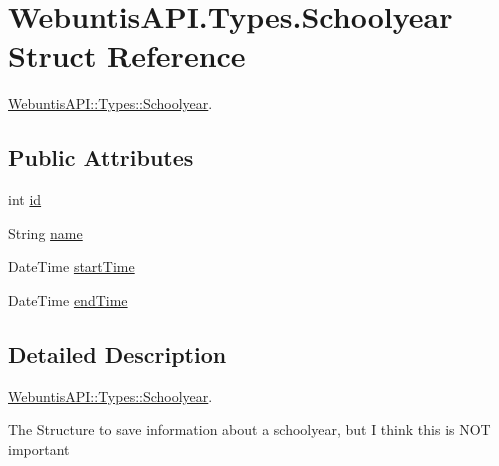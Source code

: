 \hypertarget{struct_webuntis_a_p_i_1_1_types_1_1_schoolyear}{\section{Webuntis\-A\-P\-I.\-Types.\-Schoolyear Struct Reference}
\label{struct_webuntis_a_p_i_1_1_types_1_1_schoolyear}
}


\hyperlink{struct_webuntis_a_p_i_1_1_types_1_1_schoolyear}{Webuntis\-A\-P\-I\-::\-Types\-::\-Schoolyear}.  


\subsection*{Public Attributes}
\begin{DoxyCompactItemize}
\item 
int \hyperlink{struct_webuntis_a_p_i_1_1_types_1_1_schoolyear_a5919885c6ffc12918b27fb9f13fd2c79}{id}
\item 
String \hyperlink{struct_webuntis_a_p_i_1_1_types_1_1_schoolyear_a230844174db7f59e6536a2083ade0c41}{name}
\item 
Date\-Time \hyperlink{struct_webuntis_a_p_i_1_1_types_1_1_schoolyear_a137e91a773888c2c55dcbe153290e783}{start\-Time}
\item 
Date\-Time \hyperlink{struct_webuntis_a_p_i_1_1_types_1_1_schoolyear_ab90946531bc36b904e2a71b3ee44b03f}{end\-Time}
\end{DoxyCompactItemize}


\subsection{Detailed Description}
\hyperlink{struct_webuntis_a_p_i_1_1_types_1_1_schoolyear}{Webuntis\-A\-P\-I\-::\-Types\-::\-Schoolyear}. 

The Structure to save information about a schoolyear, but I think this is N\-O\-T important 

